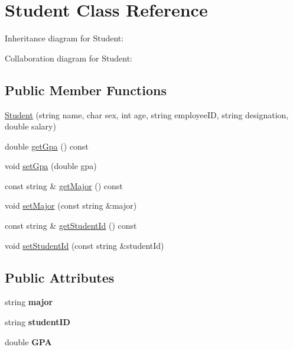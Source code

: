 \hypertarget{classStudent}{}\section{Student Class Reference}
\label{classStudent}


Inheritance diagram for Student\+:


Collaboration diagram for Student\+:
\subsection*{Public Member Functions}
\begin{DoxyCompactItemize}
\item 
\hyperlink{classStudent_a93f9c3560c396df4394e8ee430ae451a}{Student} (string name, char sex, int age, string employee\+ID, string designation, double salary)
\item 
double \hyperlink{classStudent_a3d872c6188ee2042a97614247f7ba3ef}{get\+Gpa} () const
\item 
void \hyperlink{classStudent_a8acce34a6019a9bc3642c3471544b1bc}{set\+Gpa} (double gpa)
\item 
const string \& \hyperlink{classStudent_a3459baf164df16c8dc2feccd5d5b9359}{get\+Major} () const
\item 
void \hyperlink{classStudent_a5cbba70491e876fe9410e1c6dce3064e}{set\+Major} (const string \&major)
\item 
const string \& \hyperlink{classStudent_aa7cb331368e30c08743ced08f4496fa5}{get\+Student\+Id} () const
\item 
void \hyperlink{classStudent_ad25e6194b5a4b23a31c9be9ea1918667}{set\+Student\+Id} (const string \&student\+Id)
\end{DoxyCompactItemize}
\subsection*{Public Attributes}
\begin{DoxyCompactItemize}
\item 
\mbox{\label{classStudent_a526a3eb2b24f6b046223b516ace47b0e}} 
string {\bfseries major}
\item 
\mbox{\label{classStudent_a756ca58d1bde844df762cdbb6abf9290}} 
string {\bfseries student\+ID}
\item 
\mbox{\label{classStudent_ab3759306ab4c7f48f961892bd2ff29bb}} 
double {\bfseries G\+PA}
\end{DoxyCompactItemize}


